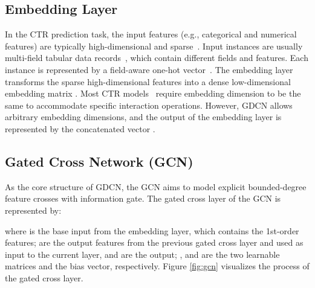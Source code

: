 \documentclass[sigconf]{acmart}
\begin{document}
\subsection{Embedding Layer}
In the CTR prediction task, the input features (e.g., categorical and numerical features) are typically high-dimensional and sparse~\cite{meng2021autopi, song2019autoint, zhao2021non}. Input instances are usually multi-field tabular
data records~\cite {wang2023cl4ctr, guo2022miss, zhao2021non}, which contain  different fields and  features. Each instance is represented by a field-aware one-hot vector~\cite{song2019autoint, wang2022enhancing, meng2021autopi}. The embedding layer transforms the sparse high-dimensional features into a dense low-dimensional embedding matrix . Most CTR models~\cite{naumov2019deep, qu2018product, huang2019fibinet, song2019autoint, meng2021autopi, guo2017deepfm} require embedding dimension to be the same to accommodate specific interaction operations. However, GDCN allows arbitrary embedding dimensions, and the output of the embedding layer is represented by the concatenated vector .


\subsection{Gated Cross Network (GCN)}
As the core structure of GDCN, the GCN aims to model explicit bounded-degree feature crosses with information gate. The  gated cross layer of the GCN is represented by:
\begin{small}

\end{small}
where  is the base input from the embedding layer, which contains the 1st-order features;  are the output features from the previous  gated cross layer and used as input to the current  layer, and  are the output; ,  and  are the two learnable matrices and the bias vector, respectively. Figure \ref{fig:gcn} visualizes the process of the gated cross layer.
\end{document}
